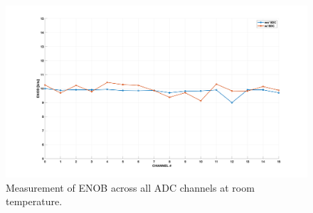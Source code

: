 \begin{figure}[ht!]
  \centering
  \includegraphics[width=0.8\linewidth]{figures/sdc_measurements/enob_rt.png}
  \caption{Measurement of ENOB across all ADC channels at room temperature.}
  \label{fig;sdc;enob_rt}
\end{figure}
